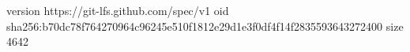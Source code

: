 version https://git-lfs.github.com/spec/v1
oid sha256:b70dc78f764270964c96245e510f1812e29d1e3f0df4f14f2835593643272400
size 4642
